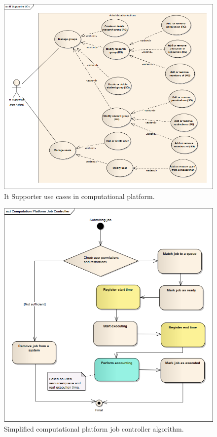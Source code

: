 \documentclass{report}
\begin{document}
	\begin{figure}[!hbtp]
		\centering
		\includegraphics[width=\textwidth, angle=0]{../ea_files/generatedImages/Computational_platform/ITSupporterUCs.png}
		\caption{It Supporter use cases in computational platform.}
		\label{app:cp:itucs}
	\end{figure}
	\begin{figure}[!hbtp]
		\centering
		\includegraphics[width=\textwidth]{../ea_files/generatedImages/Computational_platform/ComputationPlatformJobController.png}
		\caption{Simplified computational platform job controller algorithm.}
		\label{app:cp:jobcontroller}
	\end{figure}
\clearpage
\end{document}
